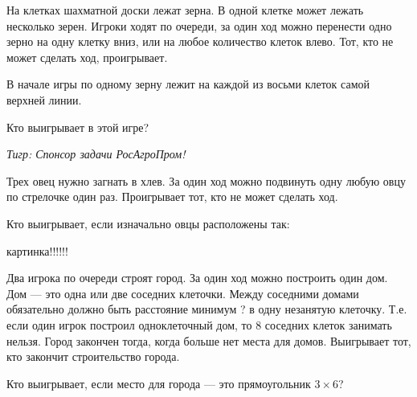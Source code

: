 \begin{problem}
На клетках шахматной доски лежат зерна. В одной клетке может лежать несколько зерен. Игроки ходят по очереди, за один ход можно перенести одно зерно на одну клетку вниз, или на любое количество клеток влево. Тот, кто не может сделать ход, проигрывает.\par
В начале игры по одному зерну лежит на каждой из восьми клеток самой верхней линии.\par
Кто выигрывает в этой игре?\par
{\it Тигр: Спонсор задачи РосАгроПром!}



\begin{sol}

\end{sol}
\end{problem}




\begin{problem}
Трех овец нужно загнать в хлев. За один ход можно подвинуть одну любую овцу по стрелочке один раз. Проигрывает тот, кто не может сделать ход. \par
Кто выигрывает, если изначально овцы расположены так:


{\red картинка!!!!!!}



\begin{sol}

\end{sol}
\end{problem}



\begin{problem}

Два игрока по очереди строят город. За один ход можно построить один дом. Дом --- это одна или две соседних клеточки. Между соседними домами обязательно должно быть расстояние минимум {\red ?} в одну незанятую клеточку. Т.е. если один игрок построил одноклеточный дом, то 8 соседних клеток занимать нельзя. Город закончен тогда, когда больше нет места для домов. Выигрывает тот, кто закончит строительство города.

Кто выигрывает, если место для города --- это прямоугольник $3\times 6$?



\begin{sol}

\end{sol}
\end{problem}




